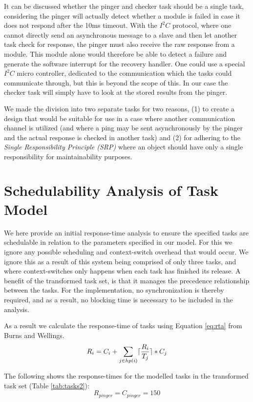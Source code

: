 It can be discussed whether the pinger and checker task should be a single task, considering the pinger will actually detect whether a module is failed in case it does not respond after the 10ms timeout. With the $\textit{I}^2\textit{C}$ protocol, where one cannot directly send an asynchronous message to a slave and then let another task check for response, the pinger must also receive the raw response from a module. This module alone would therefore be able to detect a failure and generate the software interrupt for the recovery handler. One could use a special $\textit{I}^2\textit{C}$ micro controller, dedicated to the communication which the tasks could communicate through, but this is beyond the scope of this. In our case the checker task will simply have to look at the stored results from the pinger.

We made the division into two separate tasks for two reasons, (1) to create a design that would be suitable for use in a case where another communication channel is utilized (and where a ping may be sent asynchronously by the pinger and the actual response is checked in another task) and (2) for adhering to the \textit{Single Responsibility Principle (SRP)} where an object should have only a single responsibility for maintainability purposes.

\section{Schedulability Analysis of Task Model}
We here provide an initial response-time analysis to ensure the specified tasks are schedulable in relation to the parameters specified in our model. For this we ignore any possible scheduling and context-switch overhead that would occur. We ignore this as a result of this system being comprised of only three tasks, and where context-switches only happens when each task has finished its release. A benefit of the transformed task set, is that it manages the precedence relationship between the tasks. For the implementation, no synchronization is thereby required, and as a result, no blocking time is necessary to be included in the analysis.

As a result we calculate the response-time of tasks using Equation \ref{eq:rta} from Burns and Wellings.
\begin{equation}
\label{eq:rta}
     R_{i} = C_{i} + \sum\limits_{j\in hp(i)} \lceil\frac{R_{i}}{T_{j}}\rceil*C_{j}
\end{equation}

The following shows the response-times for the modelled tasks in the transformed task set (Table \ref{tab:tasks2}):
\begin{equation}
\label{eq:pingerrta}
     R_{pinger} = C_{pinger} = 150 
\end{equation}

